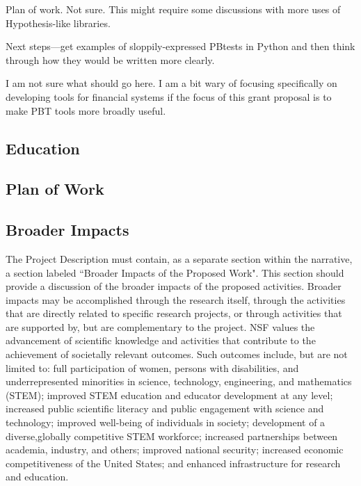 Plan of work. Not sure. This might require some discussions with more uses of Hypothesis-like libraries.

Next steps—get examples of sloppily-expressed PBtests in Python and then think through how they would be written more clearly.




I am not sure what should go here. I am a bit wary of focusing specifically on developing tools for financial systems if the focus of this grant proposal is to make PBT tools more broadly useful.

\subsection{Education }

\subsection{Plan of Work }


\subsection{Broader Impacts }
The Project Description must contain, as a separate section within the narrative, a section labeled ``Broader
Impacts of the Proposed Work". This section should provide a discussion of the broader impacts of the proposed
activities. Broader impacts may be accomplished through the research itself, through the activities that are
directly related to specific research projects, or through activities that are supported by, but are complementary to
the project. NSF values the advancement of scientific knowledge and activities that contribute to the
achievement of societally relevant outcomes. Such outcomes include, but are not limited to: full
participation of women, persons with disabilities, and underrepresented minorities in science, technology, engineering, and
mathematics (STEM); improved STEM education and educator development at any level; increased public
scientific literacy and public engagement with science and technology; improved well-being of individuals in
society; development of a diverse,globally competitive STEM workforce; increased partnerships between
academia, industry, and others; improved national security; increased economic competitiveness of the United
States; and enhanced infrastructure for research and education.

